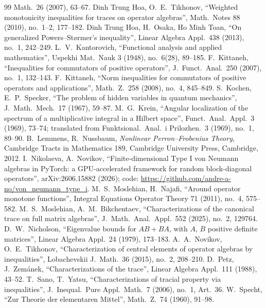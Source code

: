 \documentclass[11pt]{article}
\theoremstyle{plain}
\theoremstyle{definition}
\theoremstyle{remark}
\begin{document}
{\begin{thebibliography}{99}
  Math.\ 26 (2007), 63--67.
 Dinh Trung Hoa, O.~E.~Tikhonov, ``Weighted monotonicity inequalities for traces on operator
  algebras'', Math.\ Notes 88 (2010), no.~1--2, 177--182.
 Dinh Trung Hoa, H.~Osaka, Ho Minh Toan, ``On generalized Powers--St{\o}rmer's inequality'', Linear
  Algebra Appl.\ 438 (2013), no.~1, 242--249.
 L.~V.~Kantorovich, ``Functional analysis and applied mathematics'', Uspekhi Mat.\ Nauk 3
  (1948), no.~6(28), 89--185.
 F.~Kittaneh, ``Inequalities for commutators of positive operators'', J.\ Funct.\ Anal.\ 250
  (2007), no.~1, 132--143.
 F.~Kittaneh, ``Norm inequalities for commutators of positive operators and applications'',
  Math.\ Z.\ 258 (2008), no.~4, 845--849.
 S.~Kochen, E.~P.~Specker, ``The problem of hidden variables in quantum mechanics'', J.\ Math.\ Mech.\
  17 (1967), 59--87.
 M.~G.~Krein, ``Angular localization of the spectrum of a multiplicative integral in a Hilbert
  space'', Funct.\ Anal.\ Appl.\ 3 (1969), 73--74; translated from Funktsional.\ Anal.\ i Prilozhen.\ 3 (1969), no.~1, 89--90.
\bibitem{lemmens2012} B.~Lemmens, R.~Nussbaum, \emph{Nonlinear Perron--Frobenius Theory}, Cambridge Tracts in
  Mathematics 189, Cambridge University Press, Cambridge, 2012.
 I.~Nikolaeva, A.~Novikov, ``Finite-dimensional Type I von Neumann algebras in PyTorch: a
  GPU-accelerated framework for random block-diagonal operators'', arXiv:2606.15882 (2026);
  code: \url{https://github.com/andre-a-no/von_neumann_type_i}.
 M.~S.~Moslehian, H.~Najafi, ``Around operator monotone functions'', Integral Equations
  Operator Theory 71 (2011), no.~4, 575--582.
 M.~S.~Moslehian, A.~M.~Bikchentaev, ``Characterizations of the canonical trace on full
  matrix algebras'', J.\ Math.\ Anal.\ Appl.\ 552 (2025), no.~2, 129764.
\bibitem{nicholson1979} D.~W.~Nicholson, ``Eigenvalue bounds for $AB+BA$, with $A$, $B$ positive definite
  matrices'', Linear Algebra Appl.\ 24 (1979), 173--183.
 A.~A.~Novikov, O.~E.~Tikhonov, ``Characterization of central elements of operator
  algebras by inequalities'', Lobachevskii J.\ Math.\ 36 (2015), no.~2, 208--210.
\bibitem{petz1988} D.~Petz, J.~Zem\'anek, ``Characterizations of the trace'', Linear Algebra Appl.\ 111
  (1988), 43--52.
 T.~Sano, T.~Yatsu, ``Characterizations of tracial property via inequalities'', J.\ Inequal.\ Pure
  Appl.\ Math.\ 7 (2006), no.~1, Art.~36.
 W.~Specht, ``Zur Theorie der elementaren Mittel'', Math.\ Z.\ 74 (1960), 91--98.

\end{thebibliography}}
\end{document}
